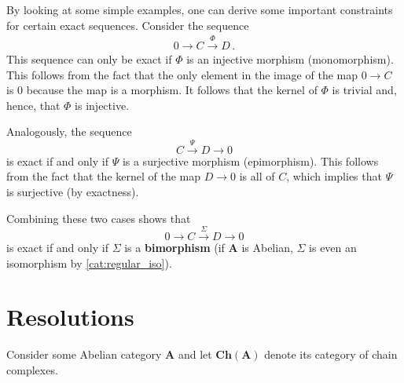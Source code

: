 	\begin{property}
		By looking at some simple examples, one can derive some important constraints for certain exact sequences. Consider the sequence
		\begin{gather}
			0\longrightarrow C\overset{\Phi}{\longrightarrow}D\,.
		\end{gather}
		This sequence can only be exact if $\Phi$ is an injective morphism (monomorphism). This follows from the fact that the only element in the image of the map $0\rightarrow C$ is 0 because the map is a morphism. It follows that the kernel of $\Phi$ is trivial and, hence, that $\Phi$ is injective.

		Analogously, the sequence \[C\overset{\Psi}{\longrightarrow}D\longrightarrow0\] is exact if and only if $\Psi$ is a surjective morphism (epimorphism). This follows from the fact that the kernel of the map $D\rightarrow0$ is all of $C$, which implies that $\Psi$ is surjective (by exactness).

		Combining these two cases shows that \[0\longrightarrow C\overset{\Sigma}{\longrightarrow}D\longrightarrow0\] is exact if and only if $\Sigma$ is a \textbf{bimorphism} (if $\mathbf{A}$ is Abelian, $\Sigma$ is even an isomorphism by \cref{cat:regular_iso}).
	\end{property}

\section{Resolutions}

	Consider some Abelian category $\mathbf{A}$ and let $\mathbf{Ch(A)}$ denote its category of chain complexes.



